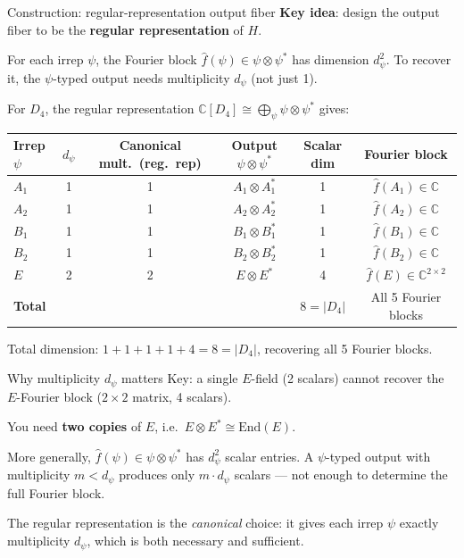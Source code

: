 \documentclass[aspectratio=169]{beamer}
\newcommand{\C}{\mathbb{C}}
\begin{document}
\begin{frame}{Construction: regular-representation output fiber}
  \textbf{Key idea}: design the output fiber to be the \textbf{regular representation} of $H$.

  \medskip

  For each irrep $\psi$, the Fourier block $\hat{f}(\psi) \in \psi \otimes \psi^*$ has dimension $d_\psi^2$. To recover it, the $\psi$-typed output needs multiplicity $d_\psi$ (not just 1).

  \medskip

  For $D_4$, the regular representation $\C[D_4] \cong \bigoplus_\psi \psi \otimes \psi^*$ gives:
  \begin{center}\scriptsize
  \begin{tabular}{lccccc}
    \toprule
    Irrep $\psi$ & $d_\psi$ & Canonical mult.\ (reg.\ rep) & Output $\psi \otimes \psi^*$ & Scalar dim & Fourier block \\
    \midrule
    $A_1$ & 1 & 1 & $A_1 \otimes A_1^*$ & 1 & $\hat{f}(A_1) \in \C$ \\
    $A_2$ & 1 & 1 & $A_2 \otimes A_2^*$ & 1 & $\hat{f}(A_2) \in \C$ \\
    $B_1$ & 1 & 1 & $B_1 \otimes B_1^*$ & 1 & $\hat{f}(B_1) \in \C$ \\
    $B_2$ & 1 & 1 & $B_2 \otimes B_2^*$ & 1 & $\hat{f}(B_2) \in \C$ \\
    $E$ & 2 & \alert{2} & $E \otimes E^*$ & \alert{4} & $\hat{f}(E) \in \C^{2\times 2}$ \\
    \midrule
    \textbf{Total} & & & & $8 = |D_4|$ & All 5 Fourier blocks \\
    \bottomrule
  \end{tabular}
  \end{center}

  Total dimension: $1 + 1 + 1 + 1 + 4 = 8 = |D_4|$, recovering all 5 Fourier blocks.
\end{frame}

\begin{frame}{Why multiplicity $d_\psi$ matters}
  \alert{Key}: a single $E$-field (2 scalars) cannot recover the $E$-Fourier block ($2\!\times\!2$ matrix, 4 scalars).

  \bigskip

  You need \textbf{two copies} of $E$, i.e.\ $E \otimes E^* \cong \mathrm{End}(E)$.

  \medskip

  More generally, $\hat{f}(\psi) \in \psi \otimes \psi^*$ has $d_\psi^2$ scalar entries. A $\psi$-typed output with multiplicity $m < d_\psi$ produces only $m \cdot d_\psi$ scalars --- not enough to determine the full Fourier block.

  \bigskip

  The regular representation is the \textit{canonical} choice: it gives each irrep $\psi$ exactly multiplicity $d_\psi$, which is both necessary and sufficient.
\end{frame}
\end{document}
